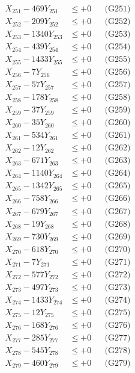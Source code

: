\documentclass[a4paper,10pt]{article}
\begin{document}
{\begin{align}
\allowbreak
X_{251} - 469Y_{251} &\leq +0 && \text{(G251)} \\
X_{252} - 209Y_{252} &\leq +0 && \text{(G252)} \\
X_{253} - 1340Y_{253} &\leq +0 && \text{(G253)} \\
X_{254} - 439Y_{254} &\leq +0 && \text{(G254)} \\
X_{255} - 1433Y_{255} &\leq +0 && \text{(G255)} \\
X_{256} - 7Y_{256} &\leq +0 && \text{(G256)} \\
X_{257} - 57Y_{257} &\leq +0 && \text{(G257)} \\
X_{258} - 178Y_{258} &\leq +0 && \text{(G258)} \\
X_{259} - 37Y_{259} &\leq +0 && \text{(G259)} \\
X_{260} - 35Y_{260} &\leq +0 && \text{(G260)} \\
\allowbreak
X_{261} - 534Y_{261} &\leq +0 && \text{(G261)} \\
X_{262} - 12Y_{262} &\leq +0 && \text{(G262)} \\
X_{263} - 671Y_{263} &\leq +0 && \text{(G263)} \\
X_{264} - 1140Y_{264} &\leq +0 && \text{(G264)} \\
X_{265} - 1342Y_{265} &\leq +0 && \text{(G265)} \\
X_{266} - 758Y_{266} &\leq +0 && \text{(G266)} \\
X_{267} - 679Y_{267} &\leq +0 && \text{(G267)} \\
X_{268} - 19Y_{268} &\leq +0 && \text{(G268)} \\
X_{269} - 730Y_{269} &\leq +0 && \text{(G269)} \\
X_{270} - 618Y_{270} &\leq +0 && \text{(G270)} \\
\allowbreak
X_{271} - 7Y_{271} &\leq +0 && \text{(G271)} \\
X_{272} - 577Y_{272} &\leq +0 && \text{(G272)} \\
X_{273} - 497Y_{273} &\leq +0 && \text{(G273)} \\
X_{274} - 1433Y_{274} &\leq +0 && \text{(G274)} \\
X_{275} - 12Y_{275} &\leq +0 && \text{(G275)} \\
X_{276} - 168Y_{276} &\leq +0 && \text{(G276)} \\
X_{277} - 285Y_{277} &\leq +0 && \text{(G277)} \\
X_{278} - 545Y_{278} &\leq +0 && \text{(G278)} \\
X_{279} - 460Y_{279} &\leq +0 && \text{(G279)} \\

\end{align}}
\end{document}
